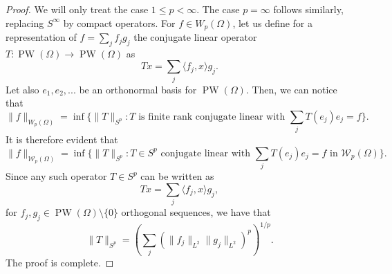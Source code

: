 \documentclass[10pt,a4paper]{amsart}
\DeclareMathOperator{\PW}{PW}
\begin{document}
\begin{proof}
	We will only treat the case $1\leq p<\infty.$ The case $p=\infty$ follows similarly, replacing $S^\infty$ by compact operators. For $f\in W_p(\Omega)$, let us define for a representation of $f=\sum_j f_jg_j$ the conjugate linear operator $T:\PW(\Omega)\to \PW(\Omega)$ as
	$$Tx=\sum_j \langle f_j,x\rangle g_j.$$
Let also $e_1,e_2,...$ be an orthonormal basis for $\PW(\Omega)$. Then, we can notice that
	$$\|f\|_{W_p(\Omega)}=\inf\{\|T\|_{S^p}: T\text{ is finite rank conjugate linear with }\sum_j T(e_j)e_j=f\}.$$
	It is therefore evident that
	$$\|f\|_{\mathcal{W}_p(\Omega)}=\inf\{\|T\|_{S^p}: T\in S^p\text{ conjugate linear with }\sum_j T(e_j)e_j=f \text{ in }\mathcal{W}_p(\Omega)\}.$$
	Since any such operator $T\in S^p$ can be written as 
	$$Tx=\sum_j \langle f_j,x\rangle g_j,$$ for $f_j,g_j\in \PW(\Omega)\setminus\{0\}$ orthogonal sequences, we have that
	$$\|T\|_{S^p}=\left(\sum_j (\|f_j\|_{L^2}\|g_j\|_{L^2})^p\right)^{1/p}.$$
	The proof is complete.
\end{proof}
\end{document}
